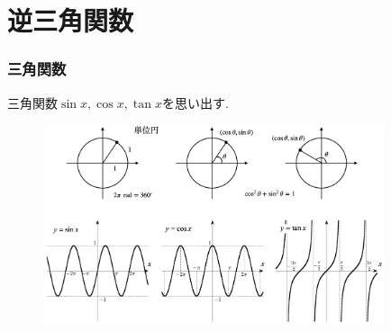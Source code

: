 %
%
%




\section{逆三角関数}

\begin{frame}
\frametitle{三角関数}

三角関数$\sin x, \cos x, \tan x$を思い出す. 


 \begin{figure}[htbp]
 \begin{center} 
  \includegraphics[width=100mm]{calculus6/trig2.png}
 \end{center}
\end{figure}


\end{frame}





